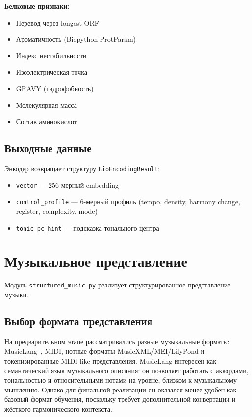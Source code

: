\textbf{Белковые признаки:}
\begin{itemize}
\item Перевод через longest ORF
\item Ароматичность (Biopython ProtParam)
\item Индекс нестабильности
\item Изоэлектрическая точка
\item GRAVY (гидрофобность)
\item Молекулярная масса
\item Состав аминокислот
\end{itemize}

\subsection{Выходные данные}

Энкодер возвращает структуру \texttt{BioEncodingResult}:
\begin{itemize}
\item \texttt{vector} — 256-мерный embedding
\item \texttt{control\_profile} — 6-мерный профиль (tempo, density, harmony change, register, complexity, mode)
\item \texttt{tonic\_pc\_hint} — подсказка тонального центра
\end{itemize}

\section{Музыкальное представление}

Модуль \texttt{structured\_music.py} реализует структурированное представление музыки.

\subsection{Выбор формата представления}

На предварительном этапе рассматривались разные музыкальные форматы: MusicLang~\cite{musiclang}, MIDI, нотные форматы MusicXML/MEI/LilyPond и токенизированные MIDI-like представления. MusicLang интересен как семантический язык музыкального описания: он позволяет работать с аккордами, тональностью и относительными нотами на уровне, близком к музыкальному мышлению. Однако для финальной реализации он оказался менее удобен как базовый формат обучения, поскольку требует дополнительной конвертации и жёсткого гармонического контекста.

